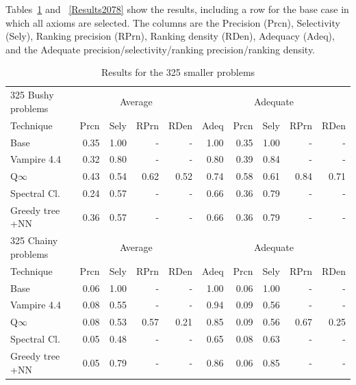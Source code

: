\documentclass[EPiC]{easychair}
\begin{document}
Tables~\ref{Results325} and ~\ref{Results2078} show the results, including
a row for the base case in which all axioms are selected.
The columns are the 
Precision (Prcn), 
Selectivity (Sely), 
Ranking precision (RPrn), 
Ranking density (RDen), 
Adequacy (Adeq),
and the Adequate precision/selectivity/ranking precision/ranking density.

\begin{table}[hbt]
\begin{center}
\begin{tabular}{|l|rrrr|r|rrrr|}
\hline
325 Bushy problems  & \multicolumn{4}{|c|}{Average} & \multicolumn{5}{|c|}{Adequate} \\
Technique       & Prcn & Sely & RPrn & RDen & Adeq & Prcn & Sely & RPrn & RDen \\
\hline
Base            & 0.35 & 1.00 &  -   &  -   & 1.00 & 0.35 & 1.00 &  -   &  -   \\
Vampire 4.4     & 0.32 & 0.80 &  -   &  -   & 0.80 & 0.39 & 0.84 &  -   &  -   \\
Q$\infty$       & 0.43 & 0.54 & 0.62 & 0.52 & 0.74 & 0.58 & 0.61 & 0.84 & 0.71 \\
Spectral Cl.    & 0.24 & 0.57 &  -   &  -   & 0.66 & 0.36 & 0.79 &  -   &  -   \\
Greedy tree +NN & 0.36 & 0.57 &  -   &  -   & 0.66 & 0.36 & 0.79 &  -   &  -   \\
\hline
\hline
325 Chainy problems & \multicolumn{4}{|c|}{Average} & \multicolumn{5}{|c|}{Adequate} \\
Technique       & Prcn & Sely & RPrn & RDen & Adeq & Prcn & Sely & RPrn & RDen \\
\hline
Base            & 0.06 & 1.00 &  -   &  -   & 1.00 & 0.06 & 1.00 &  -   &  -   \\
Vampire 4.4     & 0.08 & 0.55 &  -   &  -   & 0.94 & 0.09 & 0.56 &  -   &  -   \\
Q$\infty$       & 0.08 & 0.53 & 0.57 & 0.21 & 0.85 & 0.09 & 0.56 & 0.67 & 0.25 \\
Spectral Cl.    & 0.05 & 0.48 &  -   &  -   & 0.65 & 0.08 & 0.63 &  -   &  -   \\
Greedy tree +NN & 0.05 & 0.79 &  -   &  -   & 0.86 & 0.06 & 0.85 &  -   &  -   \\
\hline
\end{tabular}
\caption{Results for the 325 smaller problems}
\label{Results325}
\end{center}
\end{table}
\end{document}
